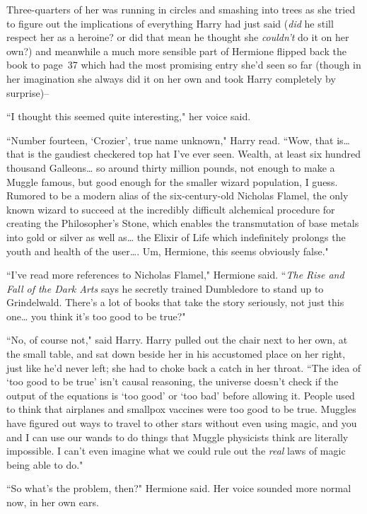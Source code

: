 Three-quarters of her was running in circles and smashing into trees as she tried to figure out the implications of everything Harry had just said (\emph{did} he still respect her as a heroine? or did that mean he thought she \emph{couldn't} do it on her own?) and meanwhile a much more sensible part of Hermione flipped back the book to page~37 which had the most promising entry she'd seen so far (though in her imagination she always did it on her own and took Harry completely by surprise)\---

``I thought this seemed quite interesting," her voice said.

``Number fourteen, `Crozier', true name unknown," Harry read. ``Wow, that is{\ldots} that is the gaudiest checkered top hat I've ever seen. Wealth, at least six hundred thousand Galleons{\ldots} so around thirty million pounds, not enough to make a Muggle famous, but good enough for the smaller wizard population, I guess. Rumored to be a modern alias of the six-century-old Nicholas Flamel, the only known wizard to succeed at the incredibly difficult alchemical procedure for creating the Philosopher's Stone, which enables the transmutation of base metals into gold or silver as well as{\ldots} the Elixir of Life which indefinitely prolongs the youth and health of the user{\ldots}. Um, Hermione, this seems obviously false."

``I've read more references to Nicholas Flamel," Hermione said. ``\emph{The Rise and Fall of the Dark Arts} says he secretly trained Dumbledore to stand up to Grindelwald. There's a lot of books that take the story seriously, not just this one{\ldots} you think it's too good to be true?"

``No, of course not," said Harry. Harry pulled out the chair next to her own, at the small table, and sat down beside her in his accustomed place on her right, just like he'd never left; she had to choke back a catch in her throat. ``The idea of `too good to be true' isn't causal reasoning, the universe doesn't check if the output of the equations is `too good' or `too bad' before allowing it. People used to think that airplanes and smallpox vaccines were too good to be true. Muggles have figured out ways to travel to other stars without even using magic, and you and I can use our wands to do things that Muggle physicists think are literally impossible. I can't even imagine what we could rule out the \emph{real} laws of magic being able to do."

``So what's the problem, then?" Hermione said. Her voice sounded more normal now, in her own ears.

